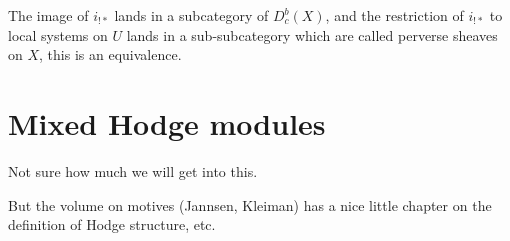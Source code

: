 \documentclass[12pt]{article}
\theoremstyle{plain}
\theoremstyle{definition}
\numberwithin{equation}{section}
\begin{document}
The image of $i_{!*}$ lands in a subcategory of $D_c^b(X)$, and the restriction of $i_{!*}$ to local systems on $U$ lands in a sub-subcategory which are called perverse sheaves on $X$, this is an equivalence.





\section{Mixed Hodge modules}

Not sure how much we will get into this.

But the volume on motives (Jannsen, Kleiman) has a nice little chapter on the definition of Hodge structure, etc.
\end{document}
